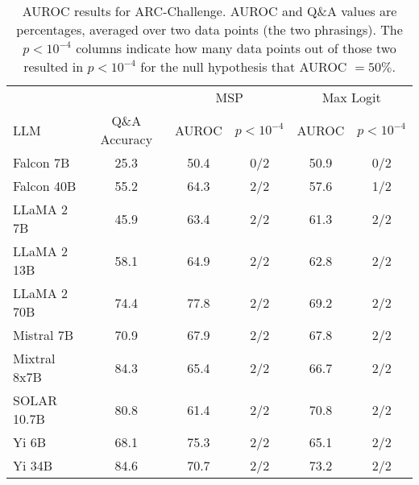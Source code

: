 \begin{table*}[!h]
\centering
\caption{AUROC results for ARC-Challenge. AUROC and Q\&A values are percentages, averaged over two data points (the two phrasings). The $p < 10^{-4}$ columns indicate how many data points out of those two resulted in $p< 10^{-4}$ for the null hypothesis that AUROC $= 50\%$.}
\label{tab:arc_auroc}
\begin{tabular}{lccccc}
\toprule
& & \multicolumn{2}{c}{MSP} & \multicolumn{2}{c}{Max Logit} \\ 
LLM & Q\&A Accuracy & AUROC & $p < 10^{-4}$ & AUROC & $p < 10^{-4}$\\ 
\cmidrule(lr){1-1} \cmidrule(lr){2-2} \cmidrule(lr){3-4} \cmidrule(lr){5-6}
Falcon 7B & 25.3 & 50.4 & 0/2 & 50.9 & 0/2 \\
Falcon 40B & 55.2 & 64.3 & 2/2 & 57.6 & 1/2 \\
LLaMA 2 7B & 45.9 & 63.4 & 2/2 & 61.3 & 2/2 \\
LLaMA 2 13B & 58.1 & 64.9 & 2/2 & 62.8 & 2/2 \\
LLaMA 2 70B & 74.4 & 77.8 & 2/2 & 69.2 & 2/2 \\
Mistral 7B & 70.9 & 67.9 & 2/2 & 67.8 & 2/2 \\
Mixtral 8x7B & 84.3 & 65.4 & 2/2 & 66.7 & 2/2 \\
SOLAR 10.7B & 80.8 & 61.4 & 2/2 & 70.8 & 2/2 \\
Yi 6B & 68.1 & 75.3 & 2/2 & 65.1 & 2/2 \\
Yi 34B & 84.6 & 70.7 & 2/2 & 73.2 & 2/2 \\
\bottomrule
\end{tabular}
\end{table*}
